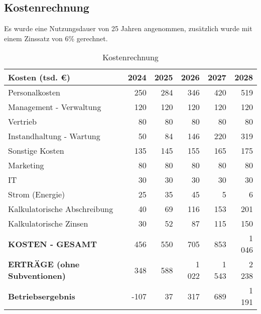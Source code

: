 \subsection{Kostenrechnung}

Es wurde eine Nutzungsdauer von 25 Jahren angenommen, zusätzlich wurde mit einem Zinssatz von 6\% gerechnet.

\begin{table}[H]
    \centering
    \begin{tabular}{lrrrrr}
        \toprule
        \textbf{Kosten} (tsd. \euro{})       & \textbf{2024} & \textbf{2025} & \textbf{2026} & \textbf{2027} & \textbf{2028} \\
        \midrule
        Personalkosten                       & 250           & 284           & 346           & 420           & 519           \\
        Management - Verwaltung              & 120           & 120           & 120           & 120           & 120           \\
        Vertrieb                             & 80            & 80            & 80            & 80            & 80            \\
        Instandhaltung - Wartung             & 50            & 84            & 146           & 220           & 319           \\
        Sonstige Kosten                      & 135           & 145           & 155           & 165           & 175           \\
        Marketing                            & 80            & 80            & 80            & 80            & 80            \\
        IT                                   & 30            & 30            & 30            & 30            & 30            \\
        Strom (Energie)                      & 25            & 35            & 45            & 5             & 6             \\
        Kalkulatorische Abschreibung         & 40            & 69            & 116           & 153           & 201           \\
        Kalkulatorische Zinsen               & 30            & 52            & 87            & 115           & 150           \\
        \midrule
        \textbf{KOSTEN - GESAMT}             & 456           & 550           & 705           & 853           & 1 046         \\
        \textbf{ERTRÄGE (ohne Subventionen)} & 348           & 588           & 1 022         & 1 543         & 2 238         \\
        \midrule
        \textbf{Betriebsergebnis}            & -107          & 37            & 317           & 689           & 1 191         \\
        \bottomrule
    \end{tabular}
    \caption{Kostenrechnung}
    \label{tab:kostenrechnung}
\end{table}